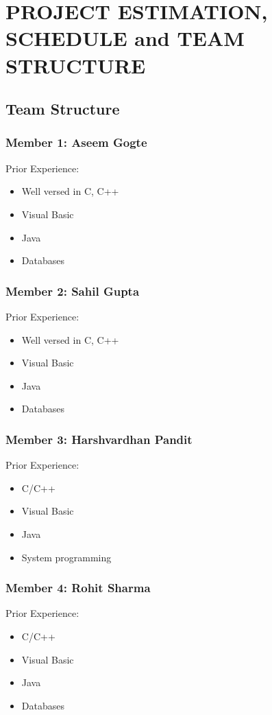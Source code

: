 \chapter{PROJECT ESTIMATION, SCHEDULE and TEAM STRUCTURE}
\section{Team Structure}
\subsection{Member 1: Aseem Gogte}
Prior Experience:
\begin{itemize}
\item Well versed in C, C++
\item Visual Basic
\item Java
\item Databases
\end{itemize}

\subsection{Member 2: Sahil Gupta}
Prior Experience:
\begin{itemize}
\item Well versed in C, C++
\item Visual Basic
\item Java
\item Databases
\end{itemize}

\subsection{Member 3: Harshvardhan Pandit}
Prior Experience:
\begin{itemize}
\item C/C++
\item Visual Basic
\item Java
\item System programming
\end{itemize}

\subsection{Member 4: Rohit Sharma}
Prior Experience:
\begin{itemize}
\item C/C++
\item Visual Basic
\item Java
\item Databases
\end{itemize}

